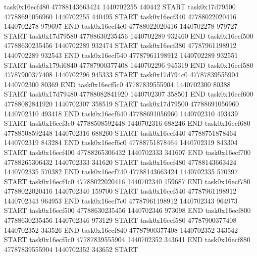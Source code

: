 task0x16ecf480 47788143663424          1440702255               440442  START
task0x17d79500 47788691056960          1440702255               440495  START
task0x16ecf340 47788022020416          1440702278               979697  END
task0x16ecf4c0 47788022020416          1440702278               979727  START
task0x17d79580 47788630235456          1440702289               932460  END
task0x16ecf500 47788630235456          1440702289               932474  START
task0x16ecf380 47787961198912          1440702289               932543  END
task0x16ecf540 47787961198912          1440702289               932551  START
task0x179d6840 47787900377408          1440702296               945319  END
task0x16ecf580 47787900377408          1440702296               945333  START
task0x17d794c0 47787839555904          1440702300                80369  END
task0x16ecf5c0 47787839555904          1440702300                80388  START
task0x17d79480 47788082841920          1440702307               358501  END
task0x16ecf600 47788082841920          1440702307               358519  START
task0x17d79500 47788691056960          1440702310               493418  END
task0x16ecf640 47788691056960          1440702310               493439  START
task0x16ecf3c0 47788508592448          1440702316               688246  END
task0x16ecf680 47788508592448          1440702316               688260  START
task0x16ecf440 47788751878464          1440702319               843284  END
task0x16ecf6c0 47788751878464          1440702319               843304  START
task0x16ecf400 47788265306432          1440702333               341607  END
task0x16ecf700 47788265306432          1440702333               341620  START
task0x16ecf480 47788143663424          1440702335               570382  END
task0x16ecf740 47788143663424          1440702335               570397  START
task0x16ecf4c0 47788022020416          1440702340               159687  END
task0x16ecf780 47788022020416          1440702340               159700  START
task0x16ecf540 47787961198912          1440702343               964953  END
task0x16ecf7c0 47787961198912          1440702343               964973  START
task0x16ecf500 47788630235456          1440702346               973098  END
task0x16ecf800 47788630235456          1440702346               973129  START
task0x16ecf580 47787900377408          1440702352               343526  END
task0x16ecf840 47787900377408          1440702352               343542  START
task0x16ecf5c0 47787839555904          1440702352               343641  END
task0x16ecf880 47787839555904          1440702352               343652  START
